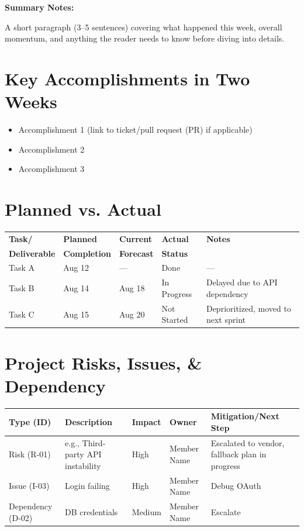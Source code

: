 \documentclass[11pt,a4paper]{article}
\begin{document}
\vspace{8pt}
\textbf{Summary Notes:}

A short paragraph (3--5 sentences) covering what happened this week, overall momentum, and anything the reader needs to know before diving into details.

\section{Key Accomplishments in Two Weeks}

\begin{itemize}
    \item Accomplishment 1 (link to ticket/pull request (PR) if applicable)
    \item Accomplishment 2
    \item Accomplishment 3
\end{itemize}

\section{Planned vs. Actual}

\begin{tabular}{p{} p{} p{} p{} p{}}
\toprule
\textbf{Task/} & \textbf{Planned} & \textbf{Current} & \textbf{Actual} & \textbf{Notes} \\
 \textbf{Deliverable} & \textbf{Completion} & \textbf{Forecast} & \textbf{Status} & \\
\midrule
Task A & Aug 12 & --- & Done & --- \\
Task B & Aug 14 & Aug 18 & In Progress & Delayed due to API dependency \\
Task C & Aug 15 & Aug 20 & Not Started & Deprioritized, moved to next sprint \\
\bottomrule
\end{tabular}

\section{Project Risks, Issues, \& Dependency}

\begin{tabular}{p{} p{} p{} p{} p{}}
\toprule
\textbf{Type (ID)} & \textbf{Description} & \textbf{Impact} & \textbf{Owner} & \textbf{Mitigation/Next Step} \\
\midrule
Risk (R-01) & e.g., Third-party API instability & High & Member Name & Escalated to vendor, fallback plan in progress \\
Issue (I-03) & Login failing & High & Member Name & Debug OAuth\\
Dependency (D-02) & DB credentials & Medium & Member Name & Escalate\\
\bottomrule
\end{tabular}
\end{document}

